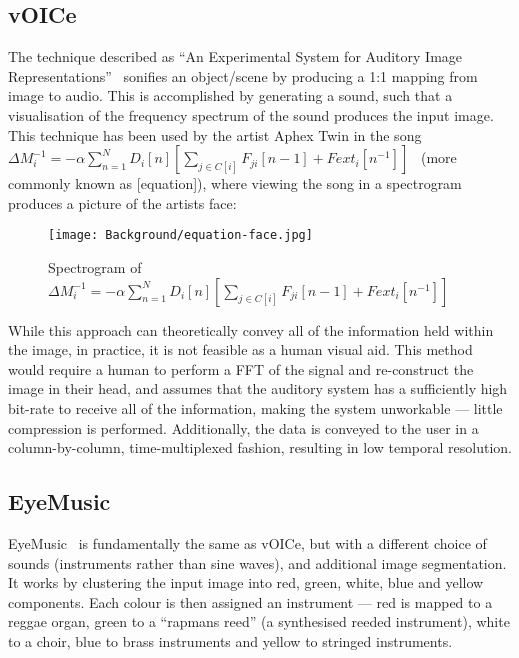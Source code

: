 \subsection{vOICe}
The technique described as ``An Experimental System for Auditory Image Representations''~\cite{vOICe} sonifies an object/scene by producing a 1:1 mapping from image to audio. This is accomplished by generating a sound, such that a visualisation of the frequency spectrum of the sound produces the input image. This technique has been used by the artist Aphex Twin in the song $\Delta M_i^{-1} = - \alpha \sum_{n=1}^N D_i \left[ n \right] \left[ \sum_{j \in C \left[ i \right]}^{} F_{ji} \left[ n -1 \right] + Fext_i \left[ n^{-1} \right] \right]$~\cite{aphex-equation} (more commonly known as [equation]), where viewing the song in a spectrogram produces a picture of the artists face:

\begin{figure}[H]
    \centering
    \texttt{[image: Background/equation-face.jpg]}
    \caption{Spectrogram of $\Delta M_i^{-1} = - \alpha \sum_{n=1}^N D_i \left[ n \right] \left[ \sum_{j \in C \left[ i \right]}^{} F_{ji} \left[ n -1 \right] + Fext_i \left[ n^{-1} \right] \right]$~\cite{aphex-equation}}
\end{figure}

While this approach can theoretically convey all of the information held within the image, in practice, it is not feasible as a human visual aid. This method would require a human to perform a \ac{FFT} of the signal and re-construct the image in their head, and assumes that the auditory system has a sufficiently high bit-rate to receive all of the information, making the system unworkable --- little compression is performed. Additionally, the data is conveyed to the user in a column-by-column, time-multiplexed fashion, resulting in low temporal resolution.

\subsection{EyeMusic}
EyeMusic~\cite{abboud2014eyemusic} is fundamentally the same as vOICe, but with a different choice of sounds (instruments rather than sine waves), and additional image segmentation. It works by clustering the input image into red, green, white, blue and yellow components. Each colour is then assigned an instrument --- red is mapped to a reggae organ, green to a ``rapmans reed'' (a synthesised reeded instrument), white to a choir, blue to brass instruments and yellow to stringed instruments.

